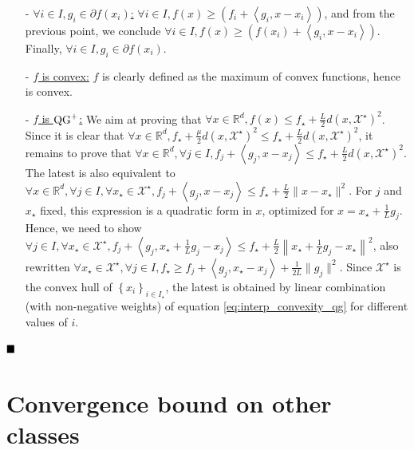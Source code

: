 \begin{itemize}
\begin{itemize}
            \item[-]\underline{$\forall i \in I, g_i \in \partial f(x_i)$:} $\forall i \in I, f(x) \geq \left( f_i + \left< g_i, x - x_i \right> \right)$, and from the previous point, we conclude $\forall i \in I, f(x) \geq \left( f(x_i) + \left< g_i, x - x_i \right> \right)$. Finally, $\forall i \in I, g_i \in \partial f(x_i)$.
            
            \item[-]\underline{$f$ is convex:} $f$ is clearly defined as the maximum of convex functions, hence is convex.
            
            \item[-]\underline{$f$ is $\operatorname{QG}^+$:} We aim at proving that $\forall x \in \mathbb{R}^d, f(x) \leq f_\star + \frac{L}{2}d\left(x, \mathcal{X}^\star \right)^2$.
            Since it is clear that $\forall x \in \mathbb{R}^d, f_\star + \frac{\mu}{2}d\left(x, \mathcal{X}^\star \right)^2 \leq f_\star + \frac{L}{2}d\left(x, \mathcal{X}^\star \right)^2$, it remains to prove that
            $\forall x \in \mathbb{R}^d, \forall j \in I, f_j + \left< g_j, x - x_j \right> \leq f_\star + \frac{L}{2}d\left(x, \mathcal{X}^\star \right)^2 $.
            The latest is also equivalent to $\forall x \in \mathbb{R}^d, \forall j \in I, \forall x_\star \in \mathcal{X}^\star, f_j + \left< g_j, x - x_j \right> \leq f_\star + \frac{L}{2}\| x - x_\star \|^2 $. For $j$ and $x_\star$ fixed, this expression is a quadratic form in $x$, optimized for $x = x_\star + \frac{1}{L}g_j$. Hence, we need to show $\forall j \in I, \forall x_\star \in \mathcal{X}^\star, f_j + \left< g_j, x_\star + \frac{1}{L}g_j - x_j \right> \leq f_\star + \frac{L}{2}\left\| x_\star + \frac{1}{L}g_j - x_\star \right\|^2 $, also rewritten $\forall x_\star \in \mathcal{X}^\star, \forall j \in I, f_\star \geq f_j + \left< g_j, x_\star - x_j \right> + \frac{1}{2L} \|g_j\|^2$.
            Since $\mathcal{X}^\star$ is the convex hull of $\left\{ x_i \right\}_{i \in I_\star}$, the latest is obtained by linear combination (with non-negative weights) of equation \ref{eq:interp_convexity_qg} for different values of $i$.
        \end{itemize}
    \end{itemize}
$\hfill\blacksquare$


\section{Convergence bound on other classes}
\label{apx:upper_assumption}


